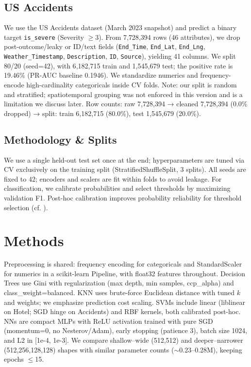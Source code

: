 \documentclass[conference]{IEEEtran}
\newcommand{\datasetB}{US Accidents}
\newcommand{\seed}{42}
\begin{document}
\subsection{\datasetB}
We use the US Accidents dataset (March 2023 snapshot) \cite{MoosaviUSAccidentsKaggle} and predict a binary target \texttt{is\_severe} (Severity $\geq 3$). From 7{,}728{,}394 rows (46 attributes), we drop post-outcome/leaky or ID/text fields (\texttt{End\_Time}, \texttt{End\_Lat}, \texttt{End\_Lng}, \texttt{Weather\_Timestamp}, \texttt{Description}, \texttt{ID}, \texttt{Source}), yielding 41 columns. We split 80/20 (seed=\seed), with 6{,}182{,}715 train and 1{,}545{,}679 test; the positive rate is 19.46\% (PR-AUC baseline 0.1946). We standardize numerics and frequency-encode high-cardinality categoricals inside CV folds. Note: our split is random and stratified; spatiotemporal grouping was not enforced in this version and is a limitation we discuss later.
Row counts: raw 7{,}728{,}394 → cleaned 7{,}728{,}394 (0.0\% dropped) → split: train 6{,}182{,}715 (80.0\%), test 1{,}545{,}679 (20.0\%).

\subsection{Methodology \& Splits}
We use a single held-out test set once at the end; hyperparameters are tuned via CV exclusively on the training split (StratifiedShuffleSplit, 3 splits). All seeds are fixed to \seed{}; encoders and scalers are fit within folds to avoid leakage. For classification, we calibrate probabilities and select thresholds by maximizing validation F1. Post-hoc calibration improves probability reliability for threshold selection (cf. \cite{Kull2019DirichletCal}).

\section{Methods}
Preprocessing is shared: frequency encoding for categoricals and StandardScaler for numerics in a scikit-learn Pipeline, with float32 features throughout. Decision Trees use Gini with regularization (max depth, min samples, ccp\_alpha) and class\_weight=balanced. KNN uses brute-force Euclidean distance with tuned $k$ and weights; we emphasize prediction cost scaling. SVMs include linear (liblinear on Hotel; SGD hinge on Accidents) and RBF kernels, both calibrated post-hoc. NNs are compact MLPs with ReLU activation trained with pure SGD (momentum=0, no Nesterov/Adam), early stopping (patience 3), batch size 1024, and L2 in [1e-4, 1e-3]. We compare shallow–wide (512,512) and deeper–narrower (512,256,128,128) shapes with similar parameter counts ($\sim$0.23–0.28M), keeping epochs $\leq$15.
\end{document}
